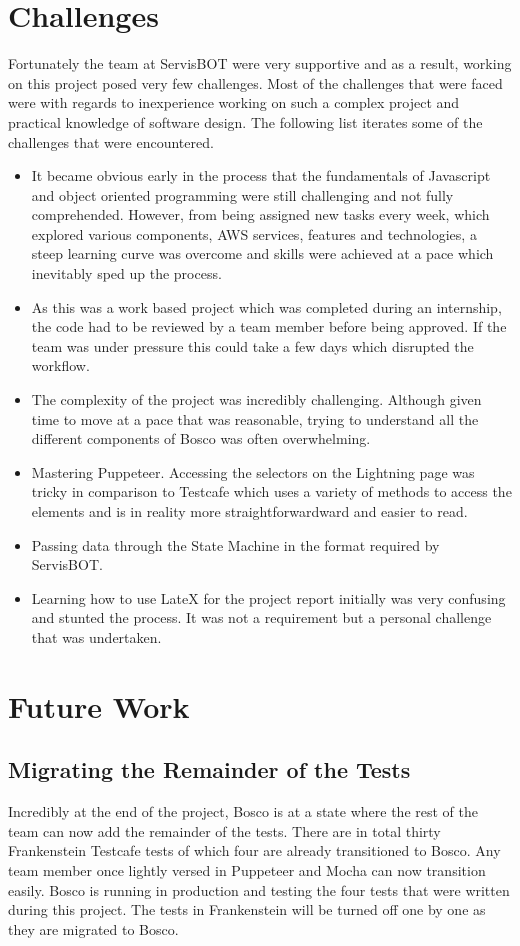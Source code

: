 \documentclass[12pt,a4paper,titlepage]{report}
\begin{document}
\section{Challenges}
Fortunately the team at ServisBOT were very supportive and as a result, working on this project posed very few challenges. 
Most of the challenges that were faced were with regards to inexperience working on such a complex project and practical knowledge of software design.
The following list iterates some of the challenges that were encountered.
\begin{itemize}
  \item It became obvious early in the process that the fundamentals of Javascript and object oriented programming were still challenging and not fully comprehended. However, from being assigned new tasks every week, which explored 
  various components, AWS services, features and technologies, a steep learning curve was overcome and skills were achieved at a pace which inevitably sped up the process.
  \item As this was a work based project which was completed during an internship, the code had to be reviewed by a team member before being approved. If the team was under pressure this could take a few days which disrupted the workflow.
  \item The complexity of the project was incredibly challenging. Although given time to move at a pace that was reasonable, trying to understand all the different components of Bosco was often overwhelming.
  \item Mastering Puppeteer. Accessing the selectors on the Lightning page was tricky in comparison to Testcafe which uses a variety of methods to access the elements and is in reality more straightforwardward and easier to read.
  \item Passing data through the State Machine in the format required by ServisBOT.  
  \item Learning how to use LateX for the project report initially was very confusing and stunted the process. It was not a requirement but a personal challenge that was undertaken. 
\end{itemize}
\section{Future Work}
\subsection{Migrating the Remainder of the Tests}
Incredibly at the end of the project, Bosco is at a state where the rest of the team can now add the remainder of the tests. 
There are in total thirty Frankenstein Testcafe tests of which four are already transitioned to Bosco. Any team member once lightly versed in Puppeteer and Mocha can now transition easily. 
Bosco is running in production and testing the four tests that were written during this project. The tests in Frankenstein will be turned off one by one as 
they are migrated to Bosco. 
\end{document}
